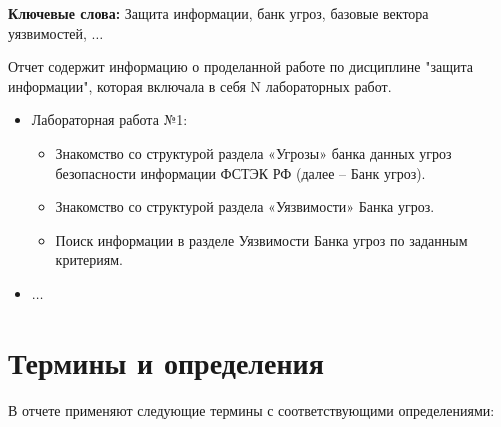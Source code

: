 \documentclass[areasetadvanced]{scrartcl}
\begin{document}
\textbf{Ключевые слова:} Защита информации, банк угроз, базовые вектора уязвимостей, $\dots$

Отчет содержит информацию о проделанной работе по дисциплине "защита информации", которая включала в себя N лабораторных работ.

\begin{itemize}
    \item Лабораторная работа №1: \begin{itemize}
        \item Знакомство со структурой раздела «Угрозы» банка данных угроз безопасности
              информации ФСТЭК РФ (далее – Банк угроз).
        \item Знакомство со структурой раздела «Уязвимости» Банка угроз.
        \item Поиск информации в разделе Уязвимости Банка угроз по заданным критериям.
    \end{itemize}
    \item $\dots$
\end{itemize}

\newpage

\section*{Термины и определения}

В отчете применяют следующие термины с соответствующими определениями:
\end{document}
